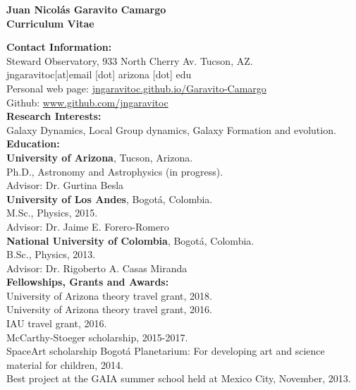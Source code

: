 \documentclass[letterpaper]{article}
\begin{document}
\begin{center}
\textbf{\LARGE Juan Nicol\'as Garavito Camargo}\\
\textbf{\large Curriculum Vitae}\\
\end{center}


\textbf{\Large Contact Information:}\\

Steward Observatory, 933 North Cherry Av. Tucson, AZ.\\
\indent jngaravitoc[at]email [dot] arizona [dot] edu\\
\indent Personal web page:
\url{jngaravitoc.github.io/Garavito-Camargo}\\
\indent Github: \url{www.github.com/jngaravitoc} \\

\textbf{\Large Research Interests:}\\

Galaxy Dynamics, Local Group dynamics, Galaxy Formation and evolution.\\

\textbf{\Large Education:}\\

\textbf{University of Arizona}, Tucson, Arizona.\\
\indent Ph.D., Astronomy and Astrophysics (in progress).\\
\indent Advisor: Dr. Gurtina Besla\\

\textbf{University of Los Andes}, Bogot\'a, Colombia.\\
\indent M.Sc., Physics, 2015.\\
\indent Advisor: Dr. Jaime E. Forero-Romero\\

\textbf{National University of Colombia}, Bogot\'a, Colombia.\\
\indent B.Sc., Physics, 2013.\\
\indent Advisor: Dr. Rigoberto A. Casas Miranda\\

\textbf{\Large Fellowships, Grants and Awards:}\\

\indent University of Arizona theory travel grant, 2018. \\
\indent University of Arizona theory travel grant, 2016. \\
\indent IAU travel grant, 2016.\\
\indent McCarthy-Stoeger scholarship, 2015-2017.\\
\indent SpaceArt scholarship Bogot\'a Planetarium: For developing art and science material for children, 2014. \\
\indent Best project at the GAIA summer school held at Mexico City, November, 2013.\\
\end{document}
